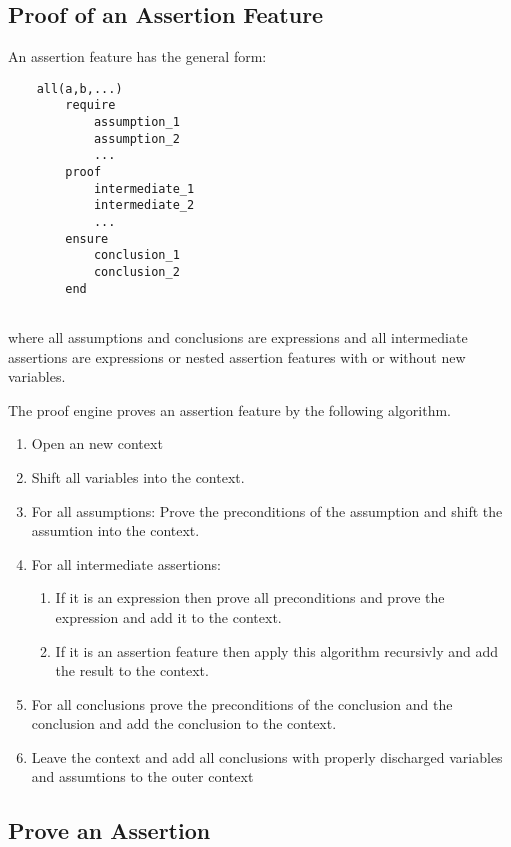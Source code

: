 \subsection{Proof of an Assertion Feature}

An assertion feature has the general form:
\begin{lstlisting}
    all(a,b,...)
        require
            assumption_1
            assumption_2
            ...
        proof
            intermediate_1
            intermediate_2
            ...
        ensure
            conclusion_1
            conclusion_2
        end
            
\end{lstlisting}
where all assumptions and conclusions are expressions and all intermediate
assertions are expressions or nested assertion features with or without new
variables.

The proof engine proves an assertion feature by the following
algorithm.

\begin{enumerate}
\item Open an new context

\item Shift all variables into the context.

\item For all assumptions: Prove the preconditions of the assumption and shift
  the assumtion into the context.

\item For all intermediate assertions:
  \begin{enumerate}
  \item If it is an expression then prove all preconditions and prove the
    expression and add it to the context.
  \item If it is an assertion feature then apply this algorithm recursivly and
    add the result to the context.
  \end{enumerate}

\item For all conclusions prove the preconditions of the conclusion and the
  conclusion and add the conclusion to the context.

\item Leave the context and add all conclusions with properly discharged
  variables and assumtions to the outer context
\end{enumerate}


\subsection{Prove an Assertion}

